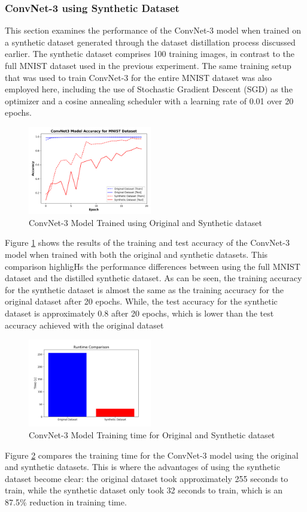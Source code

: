 \documentclass[conference, compsoc]{IEEEtran}
\begin{document}
	\subsubsection{ConvNet-3 using Synthetic Dataset} \hfill
	
	This section examines the performance of the ConvNet-3 model when trained on a synthetic dataset generated through the dataset distillation process discussed earlier. The synthetic dataset comprises 100 training images, in contrast to the full MNIST dataset used in the previous experiment. The same training setup that was used to train ConvNet-3 for the entire MNIST dataset was also employed here, including the use of Stochastic Gradient Descent (SGD) as the optimizer and a cosine annealing scheduler with a learning rate of 0.01 over 20 epochs.
	\begin{figure}[H]
		\centering
		\includegraphics[width=0.48\textwidth]{mnist_syn_acc.png}
		\caption{ConvNet-3 Model Trained using Original and Synthetic dataset}
		\label{fig:mnist_syn_acc}
	\end{figure}
	Figure \ref{fig:mnist_syn_acc} shows the results of the training and test accuracy of the ConvNet-3 model when trained with both the original and synthetic datasets. This comparison highligHs the performance differences between using the full MNIST dataset and the distilled synthetic dataset. As can be seen, the training accuracy for the synthetic dataset is almost the same as the training accuracy for the original dataset after 20 epochs. While, the test accuracy for the synthetic dataset is approximately 0.8 after 20 epochs, which is lower than the test accuracy achieved with the original dataset
	\begin{figure}[H]
		\centering
		\includegraphics[width=0.48\textwidth]{mnist_syn_time.png}
		\caption{ConvNet-3 Model Training time for Original and Synthetic dataset}
		\label{fig:mnist_syn_time}
	\end{figure}
	Figure \ref{fig:mnist_syn_time} compares the training time for the ConvNet-3 model using the original and synthetic datasets. This is where the advantages of using the synthetic dataset become clear: the original dataset took approximately 255 seconds to train, while the synthetic dataset only took 32 seconds to train, which is an 87.5\% reduction in training time.
\end{document}
